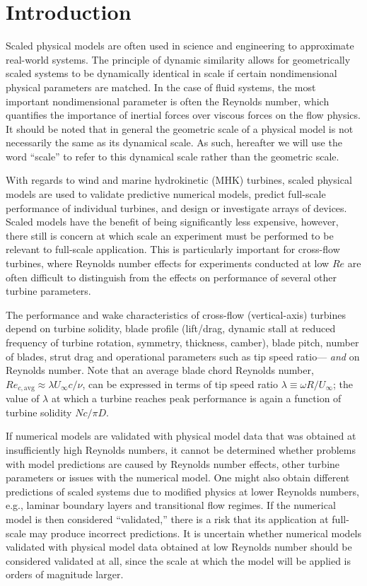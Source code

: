 \documentclass[energies,article,accept,moreauthors,pdftex,12pt,a4paper]{mdpi}
\begin{document}
\listoftodos


\section{Introduction}

Scaled physical models are often used in science and engineering to approximate
real-world systems. The principle of dynamic similarity allows for geometrically
scaled systems to be dynamically identical in scale if certain nondimensional
physical parameters are matched. In the case of fluid systems, the most
important nondimensional parameter is often the Reynolds number, which
quantifies the importance of inertial forces over viscous forces on the flow
physics. It should be noted that in general the geometric scale of a physical
model is not necessarily the same as its dynamical scale. As such, hereafter we
will use the word ``scale'' to refer to this dynamical scale rather than the
geometric scale.

With regards to wind and marine hydrokinetic (MHK) turbines, scaled physical
models are used to validate predictive numerical models, predict full-scale
performance of individual turbines, and design or investigate arrays of devices.
Scaled models have the benefit of being significantly less expensive, however,
there still is concern at which scale an experiment must be performed to be
relevant to full-scale application. This is particularly important for
cross-flow turbines, where Reynolds number effects for experiments conducted at
low $Re$ are often difficult to distinguish from the effects on performance of
several other turbine parameters.

The performance and wake characteristics of cross-flow (vertical-axis) turbines
depend on turbine solidity, blade profile (lift/drag, dynamic stall at reduced
frequency of turbine rotation, symmetry, thickness, camber), blade pitch, number
of blades, strut drag and operational parameters such as tip speed ratio---{\em
    and} on Reynolds number. Note that an average blade chord Reynolds number,
$Re_{c,\mathrm{avg}} \approx \lambda U_\infty c/ \nu$, can be expressed in terms
of tip speed ratio $\lambda \equiv \omega R/ U_\infty$; the value of $\lambda$
at which a turbine reaches peak performance is again a function of turbine
solidity $Nc/\pi D$.

If numerical models are validated with physical model data that was obtained at
insufficiently high Reynolds numbers, it cannot be determined whether problems
with model predictions are caused by Reynolds number effects, other turbine
parameters or issues with the numerical model. One might also obtain different
predictions of scaled systems due to modified physics at lower Reynolds numbers,
e.g., laminar boundary layers and transitional flow regimes. If the numerical
model is then considered ``validated,'' there is a risk that its application at
full-scale may produce incorrect predictions. It is uncertain whether numerical
models validated with physical model data obtained at low Reynolds number should
be considered validated at all, since the scale at which the model will be
applied is orders of magnitude larger.
\end{document}
